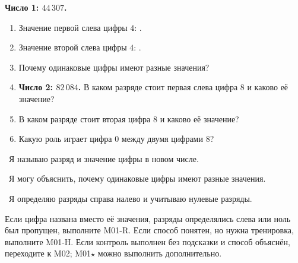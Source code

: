 \begin{checkpointbox}
  \textbf{Число 1: \(44\,307\).}
  \begin{enumerate}[label=\textbf{\arabic*.}]
    \item Значение первой слева цифры \(4\): \answerblank[22mm].
    \item Значение второй слева цифры \(4\): \answerblank[22mm].
    \item Почему одинаковые цифры имеют разные значения?
    \item \textbf{Число 2: \(82\,084\).} В каком разряде стоит первая слева
      цифра \(8\) и каково её значение?
    \item В каком разряде стоит вторая цифра \(8\) и каково её значение?
    \item Какую роль играет цифра \(0\) между двумя цифрами \(8\)?
  \end{enumerate}
\end{checkpointbox}

\begin{reflectionbox}
  \choicebox\ Я называю разряд и значение цифры в новом числе.

  \choicebox\ Я могу объяснить, почему одинаковые цифры имеют разные значения.

  \choicebox\ Я определяю разряды справа налево и учитываю нулевые разряды.
\end{reflectionbox}

\begin{notebox}
  Если цифра названа вместо её значения, разряды определялись слева или ноль
  был пропущен, выполните M01-R. Если способ понятен, но нужна тренировка,
  выполните M01-H. Если контроль выполнен без подсказки и способ объяснён,
  переходите к M02; M01\(\star\) можно выполнить дополнительно.
\end{notebox}
